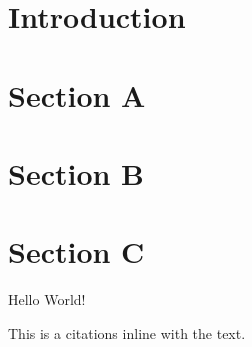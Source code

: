\documentclass{article}
\begin{document}
    \tableofcontents

    \section{Introduction}
    \section{Section A}
    \section{Section B}
    \section{Section C}
    
    Hello World!

    This is a citations \cite{EPR-paper} inline with the text.

    

    \printbibliography
\end{document}
